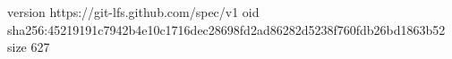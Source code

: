 version https://git-lfs.github.com/spec/v1
oid sha256:45219191c7942b4e10c1716dec28698fd2ad86282d5238f760fdb26bd1863b52
size 627

